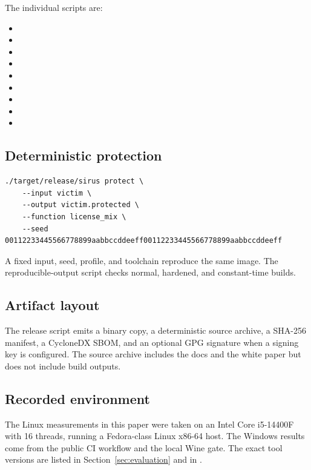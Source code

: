 The individual scripts are:
\begin{itemize}
  \item {}
  \item {}
  \item {}
  \item {}
  \item {}
  \item {}
  \item {}
  \item {}
  \item {}
\end{itemize}

\subsection{Deterministic protection}

\begin{verbatim}
./target/release/sirus protect \
    --input victim \
    --output victim.protected \
    --function license_mix \
    --seed 00112233445566778899aabbccddeeff00112233445566778899aabbccddeeff
\end{verbatim}

A fixed input, seed, profile, and toolchain reproduce the same image. The
reproducible-output script checks normal, hardened, and constant-time builds.

\subsection{Artifact layout}

The release script emits a binary copy, a deterministic source archive, a
SHA-256 manifest, a CycloneDX SBOM, and an optional GPG signature when a signing
key is configured. The source archive includes the docs and the white paper but
does not include build outputs.

\subsection{Recorded environment}

The Linux measurements in this paper were taken on an Intel Core i5-14400F with
16 threads, running a Fedora-class Linux x86-64 host. The Windows results come
from the public CI workflow and the local Wine gate. The exact tool versions are
listed in Section~\ref{sec:evaluation} and in .
